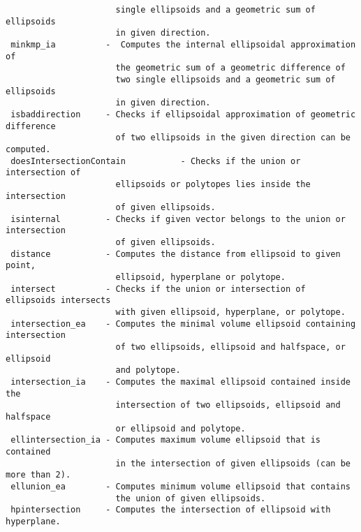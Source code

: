 \begin{verbatim}
                      single ellipsoids and a geometric sum of ellipsoids
                      in given direction.
 minkmp_ia          -  Computes the internal ellipsoidal approximation of
                      the geometric sum of a geometric difference of
                      two single ellipsoids and a geometric sum of ellipsoids
                      in given direction.
 isbaddirection     - Checks if ellipsoidal approximation of geometric difference
                      of two ellipsoids in the given direction can be computed.
 doesIntersectionContain           - Checks if the union or intersection of
                      ellipsoids or polytopes lies inside the intersection
                      of given ellipsoids.
 isinternal         - Checks if given vector belongs to the union or intersection
                      of given ellipsoids.
 distance           - Computes the distance from ellipsoid to given point,
                      ellipsoid, hyperplane or polytope.
 intersect          - Checks if the union or intersection of ellipsoids intersects
                      with given ellipsoid, hyperplane, or polytope.
 intersection_ea    - Computes the minimal volume ellipsoid containing intersection
                      of two ellipsoids, ellipsoid and halfspace, or ellipsoid
                      and polytope.
 intersection_ia    - Computes the maximal ellipsoid contained inside the
                      intersection of two ellipsoids, ellipsoid and halfspace
                      or ellipsoid and polytope.
 ellintersection_ia - Computes maximum volume ellipsoid that is contained
                      in the intersection of given ellipsoids (can be more than 2).
 ellunion_ea        - Computes minimum volume ellipsoid that contains
                      the union of given ellipsoids.
 hpintersection     - Computes the intersection of ellipsoid with hyperplane.
\end{verbatim}
